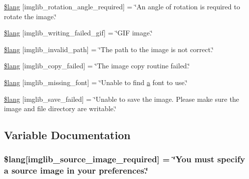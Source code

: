 \begin{DoxyCompactItemize}
\item 
\hyperlink{application_2language_2russian_2imglib__lang_8php_a1110d59ea8fd0564e78068dbda3438fb}{\$lang} \mbox{[}\textquotesingle{}imglib\+\_\+rotation\+\_\+angle\+\_\+required\textquotesingle{}\mbox{]} = \char`\"{}An angle of rotation is required to rotate the image.\char`\"{}
\item 
\hyperlink{application_2language_2russian_2imglib__lang_8php_a6169e9ed18d970dcc8965c4f195ae3e7}{\$lang} \mbox{[}\textquotesingle{}imglib\+\_\+writing\+\_\+failed\+\_\+gif\textquotesingle{}\mbox{]} = \char`\"{}G\+IF image.\char`\"{}
\item 
\hyperlink{application_2language_2russian_2imglib__lang_8php_a8ff486c25806a4731d1ffe20431df825}{\$lang} \mbox{[}\textquotesingle{}imglib\+\_\+invalid\+\_\+path\textquotesingle{}\mbox{]} = \char`\"{}The path to the image is not correct.\char`\"{}
\item 
\hyperlink{application_2language_2russian_2imglib__lang_8php_a9363000d2005b8276b39d581a11b562d}{\$lang} \mbox{[}\textquotesingle{}imglib\+\_\+copy\+\_\+failed\textquotesingle{}\mbox{]} = \char`\"{}The image copy routine failed.\char`\"{}
\item 
\hyperlink{application_2language_2russian_2imglib__lang_8php_a935800aad2be18ca4fe99bb074674848}{\$lang} \mbox{[}\textquotesingle{}imglib\+\_\+missing\+\_\+font\textquotesingle{}\mbox{]} = \char`\"{}Unable to find \hyperlink{_chart_8min_8js_aef3b685c08bc6c76c8e729bd0e93901d}{a} font to use.\char`\"{}
\item 
\hyperlink{application_2language_2russian_2imglib__lang_8php_a4d7a99fddc60c97a7327fa0125dea264}{\$lang} \mbox{[}\textquotesingle{}imglib\+\_\+save\+\_\+failed\textquotesingle{}\mbox{]} = \char`\"{}Unable to save the image. Please make sure the image and file directory are writable.\char`\"{}
\end{DoxyCompactItemize}


\subsection{Variable Documentation}
\subsubsection[{\texorpdfstring{\$lang}{$lang}}]{\setlength{\rightskip}{0pt plus 5cm}\$lang\mbox{[}\textquotesingle{}imglib\+\_\+source\+\_\+image\+\_\+required\textquotesingle{}\mbox{]} = \char`\"{}You must specify {\bf a} source image in your preferences.\char`\"{}}\hypertarget{application_2language_2russian_2imglib__lang_8php_af48787ab142f633036ebdf1cc5da7409}{}\label{application_2language_2russian_2imglib__lang_8php_af48787ab142f633036ebdf1cc5da7409}


